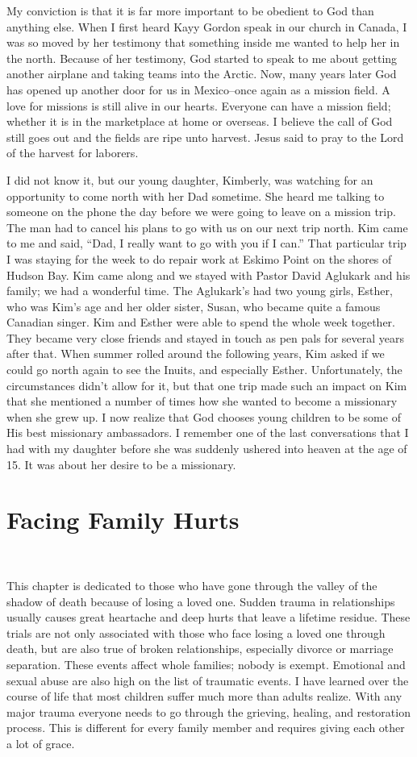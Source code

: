 \documentclass[twoside, 12pt]{book}
\begin{document}
My conviction is that it is far more important to be obedient to God than anything else. When I first heard Kayy Gordon speak in our church in Canada, I was so moved by her testimony that something inside me wanted to help her in the north. Because of her testimony, God started to speak to me about getting another airplane and taking teams into the Arctic. Now, many years later God has opened up another door for us in Mexico--once again as a mission field. A love for missions is still alive in our hearts. Everyone can have a mission field; whether it is in the marketplace at home or overseas. I believe the call of God still goes out and the fields are ripe unto harvest. Jesus said to pray to the Lord of the harvest for laborers.

I did not know it, but our young daughter, Kimberly, was watching for an opportunity to come north with her Dad sometime. She heard me talking to someone on the phone the day before we were going to leave on a mission trip. The man had to cancel his plans to go with us on our next trip north. Kim came to me and said, “Dad, I really want to go with you if I can.” That particular trip I was staying for the week to do repair work at Eskimo Point on the shores of Hudson Bay. Kim came along and we stayed with Pastor David Aglukark and his family; we had a wonderful time. The Aglukark’s had two young girls, Esther, who was Kim's age and her older sister, Susan, who became quite a famous Canadian singer. Kim and Esther were able to spend the whole week together. They became very close friends and stayed in touch as pen pals for several years after that. When summer rolled around the following years, Kim asked if we could go north again to see the Inuits, and especially Esther. Unfortunately, the circumstances didn’t allow for it, but that one trip made such an impact on Kim that she mentioned a number of times how she wanted to become a missionary when she grew up. I now realize that God chooses young children to be some of His best missionary ambassadors. I remember one of the last conversations that I had with my daughter before she was suddenly ushered into heaven at the age of 15. It was about her desire to be a missionary.


\chapter{Facing Family Hurts}
\

This chapter is dedicated to those who have gone through the valley of the shadow of death because of losing a loved one. Sudden trauma in relationships usually causes great heartache and deep hurts that leave a lifetime residue. These trials are not only associated with those who face losing a loved one through death, but are also true of broken relationships, especially divorce or marriage separation. These events affect whole families; nobody is exempt. Emotional and sexual abuse are also high on the list of traumatic events. I have learned over the course of life that most children suffer much more than adults realize. With any major trauma everyone needs to go through the grieving, healing, and restoration process. This is different for every family member and requires giving each other a lot of grace.
\end{document}
